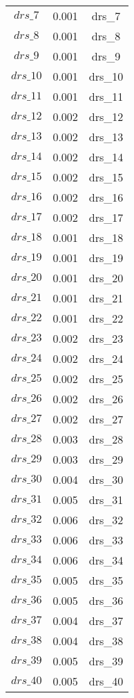 \begin{center}
\begin{longtable}{ccc}
$drs\_7$ 	 & 	 0.001 	 & 	 drs\_7\\
$drs\_8$ 	 & 	 0.001 	 & 	 drs\_8\\
$drs\_9$ 	 & 	 0.001 	 & 	 drs\_9\\
$drs\_10$ 	 & 	 0.001 	 & 	 drs\_10\\
$drs\_11$ 	 & 	 0.001 	 & 	 drs\_11\\
$drs\_12$ 	 & 	 0.002 	 & 	 drs\_12\\
$drs\_13$ 	 & 	 0.002 	 & 	 drs\_13\\
$drs\_14$ 	 & 	 0.002 	 & 	 drs\_14\\
$drs\_15$ 	 & 	 0.002 	 & 	 drs\_15\\
$drs\_16$ 	 & 	 0.002 	 & 	 drs\_16\\
$drs\_17$ 	 & 	 0.002 	 & 	 drs\_17\\
$drs\_18$ 	 & 	 0.001 	 & 	 drs\_18\\
$drs\_19$ 	 & 	 0.001 	 & 	 drs\_19\\
$drs\_20$ 	 & 	 0.001 	 & 	 drs\_20\\
$drs\_21$ 	 & 	 0.001 	 & 	 drs\_21\\
$drs\_22$ 	 & 	 0.001 	 & 	 drs\_22\\
$drs\_23$ 	 & 	 0.002 	 & 	 drs\_23\\
$drs\_24$ 	 & 	 0.002 	 & 	 drs\_24\\
$drs\_25$ 	 & 	 0.002 	 & 	 drs\_25\\
$drs\_26$ 	 & 	 0.002 	 & 	 drs\_26\\
$drs\_27$ 	 & 	 0.002 	 & 	 drs\_27\\
$drs\_28$ 	 & 	 0.003 	 & 	 drs\_28\\
$drs\_29$ 	 & 	 0.003 	 & 	 drs\_29\\
$drs\_30$ 	 & 	 0.004 	 & 	 drs\_30\\
$drs\_31$ 	 & 	 0.005 	 & 	 drs\_31\\
$drs\_32$ 	 & 	 0.006 	 & 	 drs\_32\\
$drs\_33$ 	 & 	 0.006 	 & 	 drs\_33\\
$drs\_34$ 	 & 	 0.006 	 & 	 drs\_34\\
$drs\_35$ 	 & 	 0.005 	 & 	 drs\_35\\
$drs\_36$ 	 & 	 0.005 	 & 	 drs\_36\\
$drs\_37$ 	 & 	 0.004 	 & 	 drs\_37\\
$drs\_38$ 	 & 	 0.004 	 & 	 drs\_38\\
$drs\_39$ 	 & 	 0.005 	 & 	 drs\_39\\
$drs\_40$ 	 & 	 0.005 	 & 	 drs\_40\\

\end{longtable}
\end{center}
